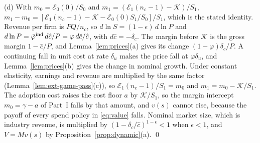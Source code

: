 (d) With $m_0=\mathcal E_0(0)/S_0$ and $m_1=(\mathcal E_1(n_c-1)-\mathcal K)/S_1$, $m_1-m_0=[\mathcal E_1(n_c-1)-\mathcal K-\mathcal E_0(0)S_1/S_0]/S_1$, which is the stated identity. Revenue per firm is $PQ/n_c$, so $d\ln S=(1-\epsilon)\,d\ln P$ and $d\ln P=\bar\varphi^{\rm ind}\,d\hat c/P=\varphi\,d\hat c/\hat c$, with $d\hat c=-\delta_c$. The margin before $\mathcal K$ is the gross margin $1-\hat c/P$, and Lemma~\ref{lem:prices}(a) gives its change $(1-\varphi)\delta_c/P$. A continuing fall in unit cost at rate $\delta_u$ makes the price fall at $\varphi\delta_u$, and Lemma~\ref{lem:prices}(b) gives the change in nominal growth. Under constant elasticity, earnings and revenue are multiplied by the same factor (Lemma~\ref{lem:ext-game-pass}(c)), so $\mathcal E_1(n_c-1)/S_1=m_0$ and $m_1=m_0-\mathcal K/S_1$. The adoption cost raises the cost floor $a$ by $\mathcal K/S_1$, so the margin intercept $m_0=\gamma-a$ of Part~I falls by that amount, and $v(s)$ cannot rise, because the payoff of every spend policy in \eqref{eq:value} falls. Nominal market size, which is industry revenue, is multiplied by $(1-\delta_c/\hat c)^{1-\epsilon}<1$ when $\epsilon<1$, and $V=Mv(s)$ by Proposition~\ref{prop:dynamic}(a). \qed

